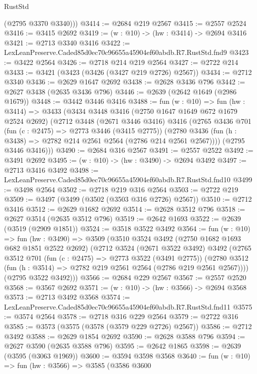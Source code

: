 \begin{lexlean}{RustStd}
\begin{coremodule}
        (@2795 @3370 @3340)))
@3414 := @2684 @219 @2567
@3415 := @2557 @2524
@3416 := @3415 @2692
@3419 := (w : @10) -> (hw : @3414) -> @2694 @3416
@3421 := @2713 @3340 @3416
@3422 := LexLeanPreserve.Caded85d0ec70c96655a45904ef60abdb.R7.RustStd.fnd9
@3423 := @3422 @2564
@3426 := @2718 @214 @219 @2564
@3427 := @2722 @214
@3433 := @3421 (@3423 (@3426 (@3427 @219 @2726) @2567))
@3434 := @2712 @3340
@3436 := @2629 @1647 @2692
@3438 := @2628 @3436 @796
@3442 := @2627 @3438 (@2635 @3436 @796)
@3446 := @2639 (@2642 @1649 (@2986 @1679))
@3448 := @3442 @3446 @3416
@3488 := fun (w : @10) =>
  fun (hw : @3414) =>
  @3433
    (@3434
      @3448
      @3416
      (@2750 @1647 @1649 @672 @1679 @2524 @2692)
      (@2712
        @3448
        (@2671 @3446 @3416)
        @3416
        (@2765
          @3436
          @701
          (fun (c : @2475) => @2773 @3446 (@3415 @2775))
          (@2780 @3436 (fun (h : @3438) => @2782 @214 @2561 @2564 (@2786 @214 @2561 @2567))))
        (@2795 @3446 @3416)))
@3490 := @2684 @316 @2567
@3491 := @2557 @2522
@3492 := @3491 @2692
@3495 := (w : @10) -> (hw : @3490) -> @2694 @3492
@3497 := @2713 @3416 @3492
@3498 := LexLeanPreserve.Caded85d0ec70c96655a45904ef60abdb.R7.RustStd.fnd10
@3499 := @3498 @2564
@3502 := @2718 @219 @316 @2564
@3503 := @2722 @219
@3509 := @3497 (@3499 (@3502 (@3503 @316 @2726) @2567))
@3510 := @2712 @3416
@3512 := @2629 @1682 @2692
@3514 := @2628 @3512 @796
@3518 := @2627 @3514 (@2635 @3512 @796)
@3519 := @2642 @1693
@3522 := @2639 (@3519 (@2909 @1851))
@3524 := @3518 @3522 @3492
@3564 := fun (w : @10) =>
  fun (hw : @3490) =>
  @3509
    (@3510
      @3524
      @3492
      (@2750 @1682 @1693 @682 @1851 @2522 @2692)
      (@2712
        @3524
        (@2671 @3522 @3492)
        @3492
        (@2765
          @3512
          @701
          (fun (c : @2475) => @2773 @3522 (@3491 @2775))
          (@2780 @3512 (fun (h : @3514) => @2782 @219 @2561 @2564 (@2786 @219 @2561 @2567))))
        (@2795 @3522 @3492)))
@3566 := @2684 @229 @2567
@3567 := @2557 @2520
@3568 := @3567 @2692
@3571 := (w : @10) -> (hw : @3566) -> @2694 @3568
@3573 := @2713 @3492 @3568
@3574 := LexLeanPreserve.Caded85d0ec70c96655a45904ef60abdb.R7.RustStd.fnd11
@3575 := @3574 @2564
@3578 := @2718 @316 @229 @2564
@3579 := @2722 @316
@3585 := @3573 (@3575 (@3578 (@3579 @229 @2726) @2567))
@3586 := @2712 @3492
@3588 := @2629 @1854 @2692
@3590 := @2628 @3588 @796
@3594 := @2627 @3590 (@2635 @3588 @796)
@3595 := @2642 @1865
@3598 := @2639 (@3595 (@3063 @1969))
@3600 := @3594 @3598 @3568
@3640 := fun (w : @10) =>
  fun (hw : @3566) =>
  @3585
    (@3586
      @3600

\end{coremodule}
\end{lexlean}
